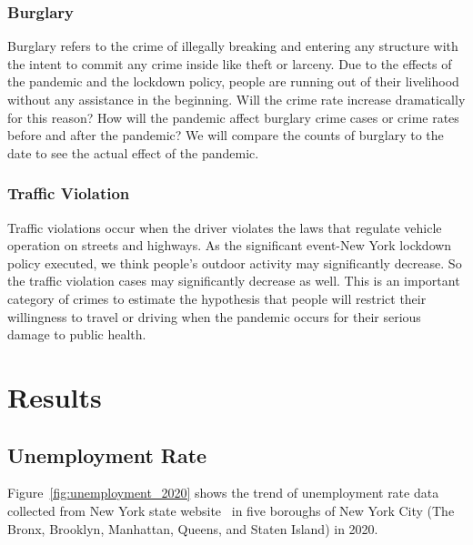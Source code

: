\documentclass[conference]{IEEEtran}
\begin{document}
\subsubsection{Burglary}
Burglary refers to the crime of illegally breaking and entering any structure with the intent to commit any crime inside like theft or larceny. Due to the effects of the pandemic and the lockdown policy, people are running out of their livelihood without any assistance in the beginning. Will the crime rate increase dramatically for this reason? How will the pandemic affect burglary crime cases or crime rates before and after the pandemic? We will compare the counts of burglary to the date to see the actual effect of the pandemic.

\subsubsection{Traffic Violation}
Traffic violations occur when the driver violates the laws that regulate vehicle operation on streets and highways. As the significant event-New York lockdown policy executed, we think people's outdoor activity may significantly decrease. So the traffic violation cases may significantly decrease as well. This is an important category of crimes to estimate the hypothesis that people will restrict their willingness to travel or driving when the pandemic occurs for their serious damage to public health.


\section{Results}

\subsection{Unemployment Rate}
 Figure~\ref{fig:unemployment_2020} shows the trend of unemployment rate data collected from New York state website~\cite{newyork2020unemployment} in five boroughs of New York City (The Bronx, Brooklyn, Manhattan, Queens, and Staten Island) in 2020.
\end{document}
